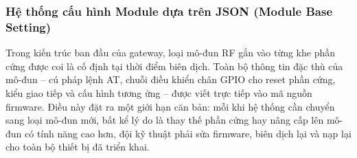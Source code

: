         
        
        
        

        \subsubsection{Hệ thống cấu hình Module dựa trên JSON (Module Base Setting)}

        Trong kiến trúc ban đầu của gateway, loại mô-đun RF gắn vào từng khe phần cứng được coi là cố định tại thời điểm biên dịch. Toàn bộ thông tin đặc thù của mô-đun -- cú pháp lệnh AT, chuỗi điều khiển chân GPIO cho reset phần cứng, kiểu giao tiếp và cấu hình tương ứng -- được viết trực tiếp vào mã nguồn firmware. Điều này đặt ra một giới hạn căn bản: mỗi khi hệ thống cần chuyển sang loại mô-đun mới, bất kể lý do là thay thế phần cứng hay nâng cấp lên mô-đun có tính năng cao hơn, đội kỹ thuật phải sửa firmware, biên dịch lại và nạp lại cho toàn bộ thiết bị đã triển khai.

